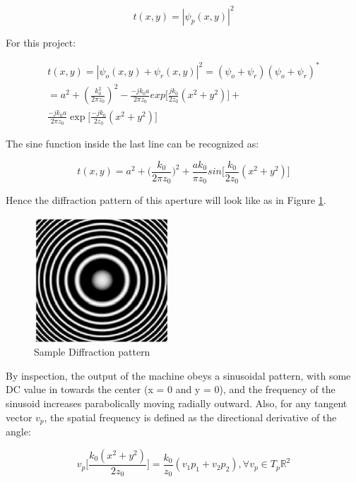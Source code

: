 \documentclass[12pt]{article}
\begin{document}
\begin{equation}
	t(x,y) = |\psi_{p}(x,y)|^2
\end{equation}

For this project:

\begin{equation}
	\begin{multlined}
	t(x,y) = |\psi_{o}(x,y) + \psi_{r}(x,y)|^2
	=(\psi_{o} + \psi_{r})(\psi_{o} + \psi_{r})^*
	\\= a^2 + (\frac{k_{0}^2}{2\pi z_{0}})^2 - \frac{-jk_{0}a}{2\pi z_{0}}
	exp\bigg[ \frac{jk_{0}}{2z_{0}}(x^2 + y^2) \bigg] +
	\\\frac{-jk_{0}a}{2\pi z_{0}}
	\exp\bigg[\frac{-jk_{0}}{2z_{0}}(x^2 + y^2) \bigg]
	\end{multlined}
\end{equation}

The sine function inside the last line can be recognized as:

\begin{equation}
	t(x,y) = a^2 + \big(\frac{k_{0}}{2\pi z_{0}}\big)^2 +
	\frac{ak_{0}}{\pi z_{0}}sin\bigg[\frac{k_{0}}{2z_{0}}(x^2 + y^2)\bigg]
\end{equation}

Hence the diffraction pattern of this aperture will look like as in Figure \ref{fig:diff_pattern}.

\begin{figure}
    \centering
    \includegraphics[width=50mm]{tupac8.png}
    \caption{Sample Diffraction pattern}
    \label{fig:diff_pattern}
\end{figure}

By inspection, the output of the machine obeys a sinusoidal pattern, with some DC value in towards the center (x = 0 and y = 0), and the frequency
of the sinusoid increases parabolically moving radially outward.
Also, for any tangent vector \(v_{p}\), the spatial frequency is defined as the directional derivative of the angle:

\begin{equation}
	v_{p}\bigg[ \frac{k_{0}(x^2 + y^2)}{2z_{0}} \bigg] = \frac{k_{0}}{z_{0}}(v_{1}p_{1} + v_{2}p_{2}), \forall v_{p} \in T_{p} \mathbb{R}^2
\end{equation}
\end{document}
